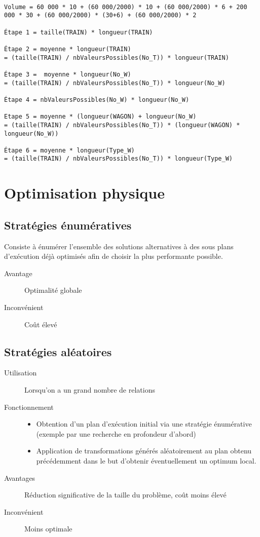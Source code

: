 \documentclass[12pt,a4paper,openany]{book}
\begin{document}
\begin{lstlisting}

Volume = 60 000 * 10 + (60 000/2000) * 10 + (60 000/2000) * 6 + 200 000 * 30 + (60 000/2000) * (30+6) + (60 000/2000) * 2

Étape 1 = taille(TRAIN) * longueur(TRAIN)

Étape 2 = moyenne * longueur(TRAIN) 
= (taille(TRAIN) / nbValeursPossibles(No_T)) * longueur(TRAIN)

Étape 3 =  moyenne * longueur(No_W) 
= (taille(TRAIN) / nbValeursPossibles(No_T)) * longueur(No_W)

Étape 4 = nbValeursPossibles(No_W) * longueur(No_W)

Etape 5 = moyenne * (longueur(WAGON) + longueur(No_W) 
= (taille(TRAIN) / nbValeursPossibles(No_T)) * (longueur(WAGON) * longueur(No_W))

Étape 6 = moyenne * longueur(Type_W) 
= (taille(TRAIN) / nbValeursPossibles(No_T)) * longueur(Type_W)

\end{lstlisting}

\chapter{Optimisation physique}
\section{Stratégies énumératives}
Consiste à énumérer l'ensemble des solutions alternatives à des sous plans d'exécution déjà optimisés afin de choisir la plus performante possible. 

\begin{description}
	\item[Avantage] Optimalité globale
	\item[Inconvénient] Coût élevé
\end{description}

\section{Stratégies aléatoires}
\begin{description}
	\item[Utilisation]Lorsqu'on a un grand nombre de relations
	\item[Fonctionnement] 
		\begin{itemize}
			\item Obtention d'un plan d'exécution initial via une stratégie énumérative (exemple par une 
				recherche en profondeur d'abord) 
			\item Application de transformations générés aléatoirement au plan obtenu précédemment dans le but d'obtenir éventuellement un optimum local.  
		\end{itemize}
\end{description}
\begin{description}
	\item[Avantages] Réduction significative de la taille du problème, coût moins élevé 
	\item[Inconvénient] Moins optimale
\end{description}
\end{document}
